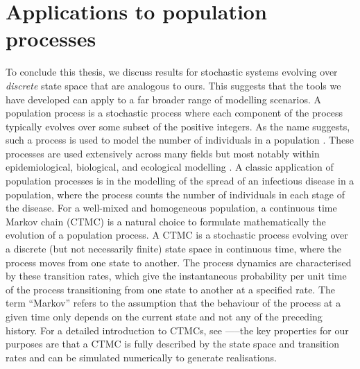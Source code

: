 \section{Applications to population processes}\label{sec:epi_disc}
To conclude this thesis, we discuss results for stochastic systems evolving over \emph{discrete} state space that are analogous to ours.
This suggests that the tools we have developed can apply to a far broader range of modelling scenarios.
A population process is a stochastic process where each component of the process typically evolves over some subset of the positive integers.
As the name suggests, such a process is used to model the number of individuals in a population \citep{Kendall_1949_StochasticProcessesPopulation}.
These processes are used extensively across many fields but most notably within epidemiological, biological, and ecological modelling \citep{Brauer_2008_CompartmentalModelsEpidemiology}.
A classic application of population processes is in the modelling of the spread of an infectious disease in a population, where the process counts the number of individuals in each stage of the disease.
For a well-mixed and homogeneous population, a continuous time Markov chain (CTMC) is a natural choice to formulate mathematically the evolution of a population process.
A CTMC is a stochastic process evolving over a discrete (but not necessarily finite) state space in continuous time, where the process moves from one state to another.
The process dynamics are characterised by these transition rates, which give the instantaneous probability per unit time of the process transitioning from one state to another at a specified rate.
The term ``Markov'' refers to the assumption that the behaviour of the process at a given time only depends on the current state and not any of the preceding history.
For a detailed introduction to CTMCs, see \citet{Anderson_1991_ContinuousTimeMarkovChains}—--the key properties for our purposes are that a CTMC is fully described by the state space and transition rates and can be simulated numerically to generate realisations.

